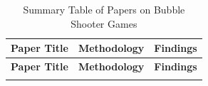 
\begin{longtable}{|p{}|p{}|p{}|}
\hline
\textbf{Paper Title} & \textbf{Methodology} & \textbf{Findings} \\
\hline
\endfirsthead

\hline
\textbf{Paper Title} & \textbf{Methodology} & \textbf{Findings} \\
\hline
\endhead

\hline
\endfoot


\caption{Summary Table of Papers on Bubble Shooter Games}
\label{tab:bubble_shooter}
\end{longtable}

